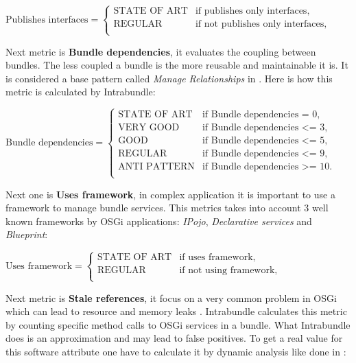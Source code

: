 \(\text{Publishes interfaces}=\begin{cases}
\text{STATE OF ART}& \text{if publishes only interfaces},\\
\text{REGULAR}& \text{if not publishes only interfaces}, \\
\end{cases} \)  \newline

Next metric is \textbf{Bundle dependencies}, it evaluates the coupling between bundles. The less coupled a bundle is the more reusable and maintainable it is. It is considered a base pattern called \emph{Manage Relationships} in \citep{Knoernschild 2012}. Here is how this metric is calculated by Intrabundle:\newline


\(\text{Bundle dependencies}=\begin{cases}
\text{STATE OF ART}& \text{if Bundle dependencies = 0},\\
\text{VERY GOOD}& \text{if Bundle dependencies <= 3}, \\
\text{GOOD}& \text{if Bundle dependencies <= 5}, \\
\text{REGULAR}& \text{if Bundle dependencies <= 9}, \\
\text{ANTI PATTERN}& \text{if Bundle dependencies >= 10}. \\
\end{cases} \)\newline 

Next one is \textbf{Uses framework}, in complex application it is important to use a framework to manage bundle services. This metrics takes into account 3 well known frameworks by OSGi applications: \emph{IPojo}, \emph{Declarative services} and \emph{Blueprint}: \newline

\(\text{Uses framework}=\begin{cases}
\text{STATE OF ART}& \text{if uses framework},\\
\text{REGULAR}& \text{if not using framework}, \\
\end{cases} \)  \newline

Next metric is \textbf{Stale references}, it focus on a very common problem in OSGi which can lead to resource and memory leaks \citep{Gama 2011}. Intrabundle calculates this metric by counting specific method calls to OSGi services in a bundle. What Intrabundle does is an approximation and may lead to false positives. To get a real value for this software attribute one have to calculate it by dynamic analysis like done in \citep{Gama 2012}:\newline

